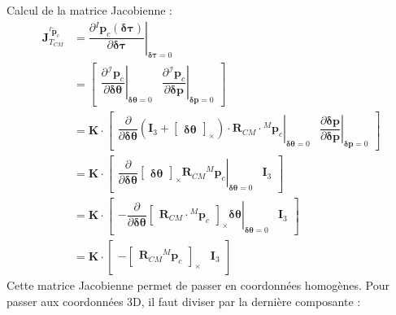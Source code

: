 \documentclass[a4paper]{article}
\begin{document}
Calcul de la matrice Jacobienne :
\begin{subequations}
\begin{align}
\bm{J}^{{}^I\tilde{\bm{p}}_c}_{T_{CM}} &= \left.\dfrac{\partial{}^I\bm{p}_c(\bm{\delta\tau})}{\partial\bm{\delta\tau}}
\right|_{\bm{\delta\tau}=0} \\
&= \begin{bmatrix} \left.\dfrac{\partial{}^{\mathcal{I}}\bm{p}_c}{\partial\bm{\delta\theta}} \right|_{\bm{\delta\theta}=0} 
& \left.\dfrac{\partial{}^{\mathcal{I}}\bm{p}_c}{\partial\bm{\delta{p}}} 
\right|_{\bm{\delta{p}}=0} \end{bmatrix}\\
&= \bm{K} \cdot 
\begin{bmatrix} 
\left.\dfrac{\partial}{\partial\bm{\delta\theta}}
\left( \bm{I}_3 + \begin{bmatrix} \bm{\delta\theta} \end{bmatrix}_{\times} \right) \cdot \bm{R}_{CM} \cdot {}^M\bm{p}_c
\right|_{\bm{\delta\theta}=0}
&
\left.\dfrac{\partial\bm{\delta{p}}}{\partial\bm{\delta{p}}}
\right|_{\bm{\delta{p}}=0}
\end{bmatrix}\\
&= \bm{K}\cdot\begin{bmatrix} 
\left.\dfrac{\partial}{\partial\bm{\delta\theta}} \begin{bmatrix} \bm{\delta\theta} \end{bmatrix}_{\times} \bm{R}_{CM} {}^M\bm{p}_c \right|_{\bm{\delta\theta}=0}
& \bm{I}_3 \end{bmatrix}\\
&= \bm{K} \cdot \begin{bmatrix} - \left. \dfrac{\partial}{\partial\bm{\delta\theta}} 
\begin{bmatrix} \bm{R}_{CM} \cdot {}^M\bm{p}_c \end{bmatrix}_{\times} \bm{\delta\theta} 
\right|_{\bm{\delta\theta}=0}
& \bm{I}_3\end{bmatrix}\\
&= \bm{K} \cdot \begin{bmatrix} - \begin{bmatrix} \bm{R}_{CM}{}^M\bm{p}_c \end{bmatrix}_{\times} & \bm{I}_3 \end{bmatrix}
\end{align}
\end{subequations}
Cette matrice Jacobienne permet de passer en coordonnées homogènes. Pour passer aux coordonnées 
3D, il faut diviser par la dernière composante :
\end{document}
